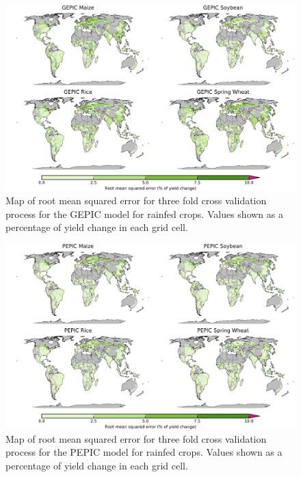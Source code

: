 \documentclass[12pt]{article}
\begin{document}
\begin{figure}[h!]
  \centering
  \includegraphics[width=15.5cm]{GEPIC_spatial_MSE_ton_ha.png}
  \caption{Map of root mean squared error for three fold cross validation process for the GEPIC model for rainfed crops. Values shown as a percentage of yield change in each grid cell.}
\end{figure}

\begin{figure}[h!]
  \centering
  \includegraphics[width=15.5cm]{PEPIC_spatial_MSE_ton_ha.png}
  \caption{Map of root mean squared error for three fold cross validation process for the PEPIC model for rainfed crops. Values shown as a percentage of yield change in each grid cell.}
\end{figure}
\end{document}
